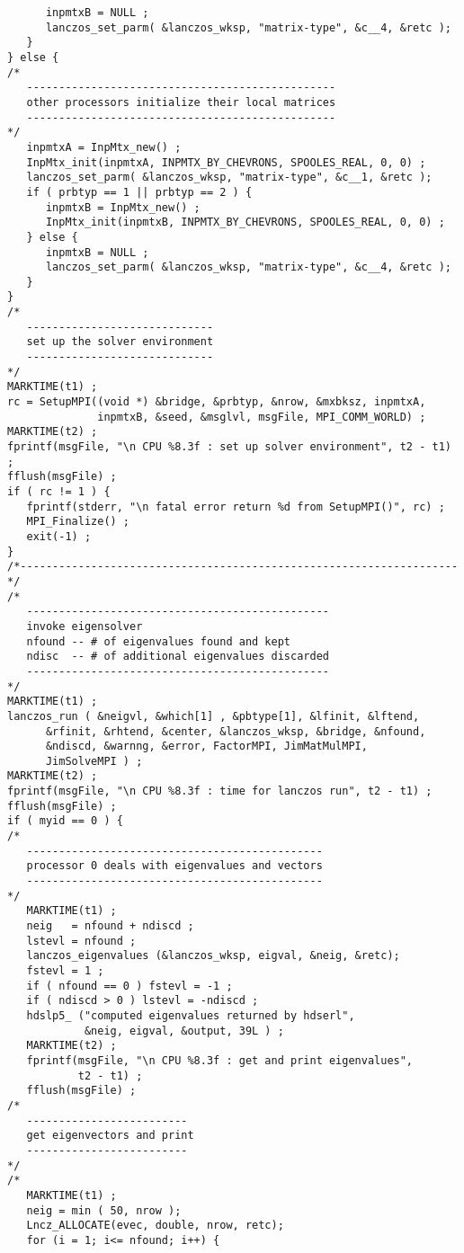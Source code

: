 \begin{verbatim}
      inpmtxB = NULL ;
      lanczos_set_parm( &lanczos_wksp, "matrix-type", &c__4, &retc );
   }
} else {
/*
   ------------------------------------------------
   other processors initialize their local matrices
   ------------------------------------------------
*/
   inpmtxA = InpMtx_new() ;
   InpMtx_init(inpmtxA, INPMTX_BY_CHEVRONS, SPOOLES_REAL, 0, 0) ;
   lanczos_set_parm( &lanczos_wksp, "matrix-type", &c__1, &retc );
   if ( prbtyp == 1 || prbtyp == 2 ) {
      inpmtxB = InpMtx_new() ;
      InpMtx_init(inpmtxB, INPMTX_BY_CHEVRONS, SPOOLES_REAL, 0, 0) ;
   } else {
      inpmtxB = NULL ;
      lanczos_set_parm( &lanczos_wksp, "matrix-type", &c__4, &retc );
   }
}
/*
   -----------------------------
   set up the solver environment
   -----------------------------
*/
MARKTIME(t1) ;
rc = SetupMPI((void *) &bridge, &prbtyp, &nrow, &mxbksz, inpmtxA, 
              inpmtxB, &seed, &msglvl, msgFile, MPI_COMM_WORLD) ;
MARKTIME(t2) ;
fprintf(msgFile, "\n CPU %8.3f : set up solver environment", t2 - t1) ;
fflush(msgFile) ;
if ( rc != 1 ) {
   fprintf(stderr, "\n fatal error return %d from SetupMPI()", rc) ;
   MPI_Finalize() ;
   exit(-1) ;
}
/*--------------------------------------------------------------------*/
/*
   -----------------------------------------------
   invoke eigensolver
   nfound -- # of eigenvalues found and kept
   ndisc  -- # of additional eigenvalues discarded
   -----------------------------------------------
*/
MARKTIME(t1) ;
lanczos_run ( &neigvl, &which[1] , &pbtype[1], &lfinit, &lftend, 
	  &rfinit, &rhtend, &center, &lanczos_wksp, &bridge, &nfound, 
	  &ndiscd, &warnng, &error, FactorMPI, JimMatMulMPI, 
	  JimSolveMPI ) ;
MARKTIME(t2) ;
fprintf(msgFile, "\n CPU %8.3f : time for lanczos run", t2 - t1) ;
fflush(msgFile) ;
if ( myid == 0 ) {
/*
   ----------------------------------------------
   processor 0 deals with eigenvalues and vectors
   ----------------------------------------------
*/
   MARKTIME(t1) ;
   neig   = nfound + ndiscd ;
   lstevl = nfound ;
   lanczos_eigenvalues (&lanczos_wksp, eigval, &neig, &retc);
   fstevl = 1 ;
   if ( nfound == 0 ) fstevl = -1 ;
   if ( ndiscd > 0 ) lstevl = -ndiscd ;
   hdslp5_ ("computed eigenvalues returned by hdserl",
            &neig, eigval, &output, 39L ) ;
   MARKTIME(t2) ;
   fprintf(msgFile, "\n CPU %8.3f : get and print eigenvalues", 
           t2 - t1) ;
   fflush(msgFile) ;
/*
   -------------------------
   get eigenvectors and print
   -------------------------
*/
/*
   MARKTIME(t1) ;
   neig = min ( 50, nrow );
   Lncz_ALLOCATE(evec, double, nrow, retc);
   for (i = 1; i<= nfound; i++) {

\end{verbatim}
